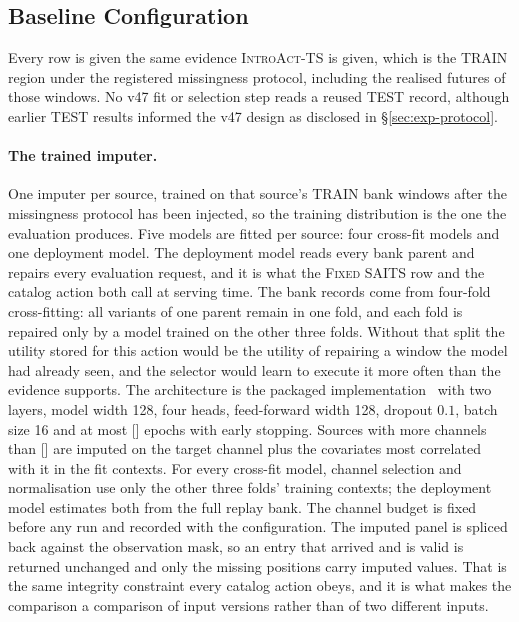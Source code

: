 \documentclass{article}
\newcommand{\ph}[1]{\textcolor{phgray}{\textsf{[\detokenize{#1}]}}}
\newcommand{\introact}{\textsc{IntroAct-TS}}
\begin{document}
\subsection{Baseline Configuration}
\label{app:baseline-config}
Every row is given the same evidence \introact{} is given, which is the TRAIN region under
the registered missingness protocol, including the realised futures of those windows. No v47
fit or selection step reads a reused TEST record, although earlier TEST results informed the
v47 design as disclosed in \S\ref{sec:exp-protocol}.

\paragraph{The trained imputer.} One imputer per source, trained on that source's TRAIN bank
windows after the missingness protocol has been injected, so the training distribution is the
one the evaluation produces. Five models are fitted per source: four cross-fit models and one
deployment model. The deployment model reads every
bank parent and repairs every evaluation request, and it is what the \textsc{Fixed SAITS} row
and the catalog action both call at serving time. The bank records come from four-fold
cross-fitting: all variants of one parent remain in one fold, and each fold is repaired only by
a model trained on the other three folds. Without that split the utility stored
for this action would be the utility of repairing a window the model had already seen, and the
selector would learn to execute it more often than the evidence supports. The architecture is the packaged implementation~\citep{du2023pypots} with
two layers, model width 128, four heads, feed-forward width 128, dropout $0.1$, batch size 16
and at most \ph{SAITS_EPOCHS} epochs with early stopping. Sources with more channels than
\ph{SAITS_MAXCH} are imputed on the target channel plus the covariates most correlated with it
in the fit contexts. For every cross-fit model, channel selection and normalisation use only
the other three folds' training contexts; the deployment model estimates both from the full
replay bank. The channel budget is fixed before any run and recorded with the configuration.
The imputed panel is spliced back against the observation mask, so an entry that arrived and is
valid is returned unchanged and only the missing positions carry imputed values. That is the
same integrity constraint every catalog action obeys, and it is what makes the comparison a
comparison of input versions rather than of two different inputs.
\end{document}
